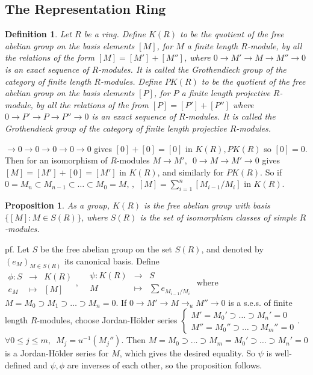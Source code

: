 \documentclass[12pt,letterpaper]{report}
\newtheorem{definition}{Definition}[section]
\newtheorem{proposition}{Proposition}[section]
\begin{document}
\subsection{The Representation Ring}
\begin{definition}Let $R$ be a ring. Define $K(R)$ to be the quotient of the free abelian group on the basis elements $[M]$, for $M$ a finite length $R$-module, by all the relations of the form $[M]=[M']+[M'']$, where $0\rightarrow M'\rightarrow M\rightarrow M''\rightarrow0$ is an exact sequence of $R$-modules. It is called the Grothendieck group of the category of finite length $R$-modules. Define $PK(R)$ to be the quotient of the free abelian group on the basis elements $[P]$, for $P$ a finite length projective $R$-module, by all the relations of the from $[P]=[P']+[P'']$ where $0\rightarrow P'\rightarrow P\rightarrow P''\rightarrow0$ is an exact sequence of $R$-modules. It is called the Grothendieck group of the category of finite length projective $R$-modules. \end{definition}
$\rightarrow 0\rightarrow0\rightarrow0\rightarrow0\rightarrow0$ gives $[0]+[0]=[0]$ in $K(R),PK(R)$ so $[0]=0$. Then for an isomorphism of $R$-modules $M\rightarrow M',\,\,\,0\rightarrow M\rightarrow M'\rightarrow0$ gives $[M]=[M']+[0]=[M']$ in $K(R)$, and similarly for $PK(R)$. So if $0=M_{n}\subset M_{n-1}\subset\dots\subset M_{0}=M,\,,\,\,[M]=\sum_{i=1}^{n}[M_{i-1}/M_{i}]$ in $K(R)$. 
\begin{proposition}As a group, $K(R)$ is the free abelian group with basis $\{[M]:M\in S(R)\}$, where $S(R)$ is the set of isomorphism classes of simple $R$-modules.\end{proposition}
pf. Let $S$ be the free abelian group on the set $S(R)$, and denoted by $(e_{M})_{M\in S(R)}$ its canonical basis. Define $\begin{array}{rrr}\phi:S&\rightarrow&K(R)\\e_{M}&\mapsto&[M]\end{array},\,\,\,\,\,\begin{array}{rrr}\psi:K(R)&\rightarrow&S\\M&\mapsto&\sum e_{M_{i-1}/M_{i}}\end{array}$ where $M=M_{0}\supset M_{1}\supset\dots\supset M_{n}=0$. If $0\rightarrow M'\rightarrow M\rightarrow_{u}M''\rightarrow0$ is a s.e.s. of finite length $R$-modules, choose Jordan-H\"older series $\left\{\begin{array}{rr}M'=M_{0}'\supset\dots\supset M_{n}'=0\\M''=M_{0}''\supset\dots\supset M_{m}''=0\end{array}\right.$. $\forall 0\leq j\leq m,\,\,\,M_{j}=u^{-1}(M_{j}'')$. Then $M=M_{0}\supset\dots\supset M_{m}=M_{0}'\supset\dots\supset M_{n}'=0$ is a Jordan-H\"older series for $M$, which gives the desired equality. So $\psi$ is well-defined and $\psi,\phi$ are inverses of each other, so the proposition follows.
\end{document}

